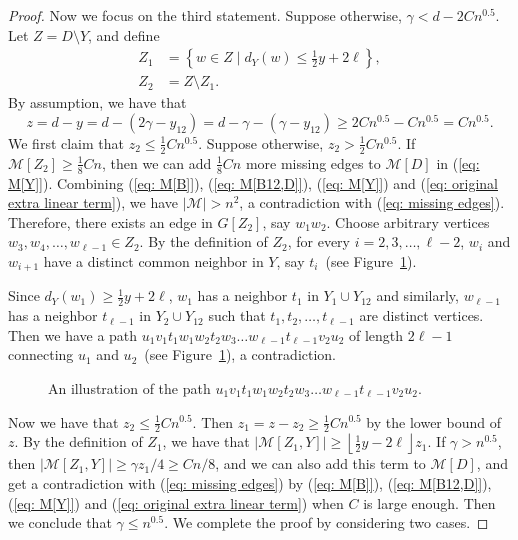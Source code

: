 \documentclass[10pt,a4paper]{amsart}
\begin{document}
\begin{proof}
	Now we focus on the third statement.
	Suppose otherwise, $\gamma < d - 2C n^{0.5}$.
	Let $Z = D\setminus Y$, and define
	\begin{equation*}
	\begin{aligned}
		Z_1 &= \left\{w \in Z \mid d_Y(w) \le \frac{1}{2}y +2\ell \right\},\\
		Z_2 &= Z\setminus Z_1.
	\end{aligned}
	\end{equation*}
	By assumption, we have that $$z = d - y=d-(2\gamma-y_{12})=d-\gamma-(\gamma-y_{12}) \ge 2C n^{0.5}-C n^{0.5}=C n^{0.5}.$$
	We first claim that $z_2 \le \frac{1}{2}C n^{0.5}$.
	Suppose otherwise, $z_2 > \frac{1}{2}C n^{0.5}$.
	If $\mathcal{M}[Z_2] \ge \frac{1}{8}C n$, then we can add $\frac{1}{8}C n$ more missing edges to $\mathcal{M}[D]$ in (\ref{eq: M[Y]}). Combining (\ref{eq: M[B]}), (\ref{eq: M[B12,D]}), (\ref{eq: M[Y]}) and (\ref{eq: original extra linear term}), we have $|\mathcal{M}|> n^2$, a contradiction with (\ref{eq: missing edges}).
	Therefore, there exists an edge in $G[Z_2]$, say $w_1w_2$.
	Choose arbitrary vertices $w_3, w_4,\ldots,w_{\ell-1} \in Z_2$.
	By the definition of $Z_2$, for every $i=2,3,\ldots,\ell-2$, $w_i$ and $w_{i+1}$ have a distinct common neighbor in $Y$, say $t_i$~(see Figure~\ref{fig: Z2}).

	Since $d_Y(w_1) \ge \frac{1}{2}y + 2\ell$, $w_1$ has a neighbor $t_1$ in $Y_1 \cup Y_{12}$ and similarly, $w_{\ell-1}$ has a neighbor $t_{\ell-1}$ in $Y_2 \cup Y_{12}$ such that $t_1,t_2,\ldots,t_{\ell-1}$ are distinct vertices.
	Then we have a path $u_1v_1t_1w_1w_2t_2w_3\ldots w_{\ell-1}t_{\ell-1}v_2u_2$ of length $2\ell -1$ connecting $u_1$ and $u_2$~(see Figure~\ref{fig: Z2}), a contradiction.

	\begin{figure}
		\centering
		
		\caption{An illustration of the path $u_1v_1t_1w_1w_2t_2w_3\ldots w_{\ell-1}t_{\ell-1}v_2u_2$.}\label{fig: Z2}
	\end{figure}

	Now we have that $z_2 \le\frac{1}{2} C n^{0.5}$. Then $z_1 = z - z_2 \ge \frac{1}{2} C n^{0.5}$ by the lower bound of $z$.
	By the definition of $Z_1$, we have that $|\mathcal{M}[Z_1, Y]| \ge \left\lfloor \frac{1}{2} y - 2\ell \right\rfloor z_1$.
	If $\gamma > n^{0.5}$, then $|\mathcal{M}[Z_1, Y]|  \ge \gamma z_1/4 \ge C n/8$, and we can also add this term to $\mathcal{M}[D]$, and get a contradiction  with (\ref{eq: missing edges}) by (\ref{eq: M[B]}), (\ref{eq: M[B12,D]}), (\ref{eq: M[Y]}) and (\ref{eq: original extra linear term}) when $C$ is large enough.
	Then we conclude that $\gamma \le n^{0.5}$. We complete the proof by considering two cases.


\end{proof}
\end{document}
